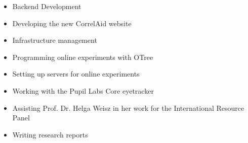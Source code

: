 \documentclass[10pt,a4paper,ragged2e,withhyper]{altacv}
\begin{document}

\makecvheader



\begin{paracol}{2}




            \begin{itemize}
                    \item Backend Development
                \end{itemize}
    
            \divider
    

            \begin{itemize}
                    \item Developing the new CorrelAid website
                    \item Infrastructure management
                \end{itemize}
    
            \divider
    

            \begin{itemize}
                    \item Programming online experiments with OTree
                    \item Setting up servers for online experiments
                    \item Working with the Pupil Labs Core eyetracker
                \end{itemize}
    
            \divider
    

            \begin{itemize}
                    \item Assisting  Prof. Dr. Helga Weisz in her work for the International Resource Panel
                    \item Writing research reports
                \end{itemize}
    

\end{paracol}
\end{document}
